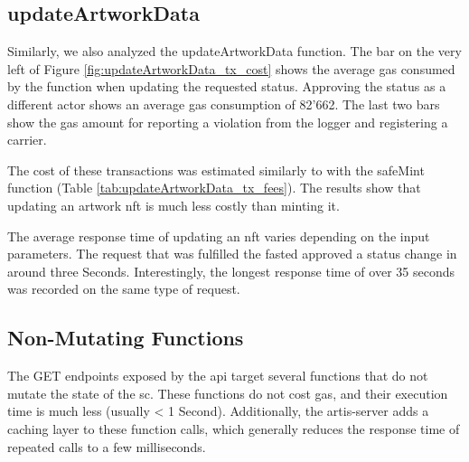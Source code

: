 \subsection*{updateArtworkData}
Similarly, we also analyzed the updateArtworkData function. The bar on the very left of Figure \ref{fig:updateArtworkData_tx_cost} shows the average gas consumed by the function when updating the requested status. Approving the status as a different actor shows an average gas consumption of 82'662. The last two bars show the gas amount for reporting a violation from the logger and registering a carrier.

The cost of these transactions was estimated similarly to with the safeMint function (Table \ref{tab:updateArtworkData_tx_fees}). The results show that updating an artwork \gls{nft} is much less costly than minting it. 

\begin{table}[h]
\caption{Estimated transaction fees updateArtworkData}
\label{tab:updateArtworkData_tx_fees}
\end{table}

The average response time of updating an \gls{nft} varies depending on the input parameters. The request that was fulfilled the fasted approved a status change in around three Seconds. Interestingly, the longest response time of over 35 seconds was recorded on the same type of request.


\subsection*{Non-Mutating Functions}
The GET endpoints exposed by the \gls{api} target several functions that do not mutate the state of the \gls{sc}. These functions do not cost gas, and their execution time is much less (usually < 1 Second). Additionally, the artis-server adds a caching layer to these function calls, which generally reduces the response time of repeated calls to a few milliseconds.

